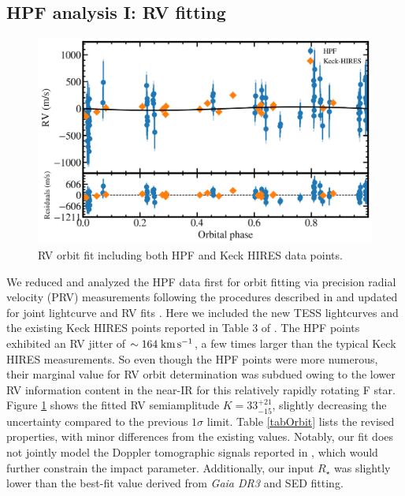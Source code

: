 \documentclass[twocolumn]{aastex631}
\newcommand{\rstar}{\ensuremath{R_\star}}
\newcommand{\kms}{\ensuremath{\rm km\,s^{-1}}}
\begin{document}
\subsection{HPF analysis I: RV fitting}
\begin{figure}
    \includegraphics[width=\linewidth]{figures/HAT-P-67b_rv.pdf}
    \caption{RV orbit fit including both HPF and Keck HIRES data points.}
    \label{fig:RVfit}
\end{figure}

We reduced and analyzed the HPF data first for orbit fitting via precision radial velocity (PRV) measurements following the procedures described in \citet{2021AJ....161..173T} and updated for joint lightcurve and RV fits \citep{2022AJ....163..225T}.  Here we included the new TESS lightcurves and the existing Keck HIRES points reported in Table 3 of \citet{2017AJ....153..211Z}.  The HPF points exhibited an RV jitter of $\sim164\;\kms$, a few times larger than the typical Keck HIRES measurements.  So even though the HPF points were more numerous, their marginal value for RV orbit determination was subdued owing to the lower RV information content in the near-IR for this relatively rapidly rotating F star.  Figure \ref{fig:RVfit} shows the fitted RV semiamplitude $K=33_{-15}^{+21}$, slightly decreasing the uncertainty compared to the previous $1\sigma$ limit.  Table \ref{tabOrbit} lists the revised properties, with minor differences from the existing values.  Notably, our fit does not jointly model the Doppler tomographic signals reported in \citep{2017AJ....153..211Z}, which would further constrain the impact parameter.  Additionally, our input $\rstar$ was slightly lower than the best-fit value derived from \emph{Gaia DR3} and SED fitting.
\end{document}
